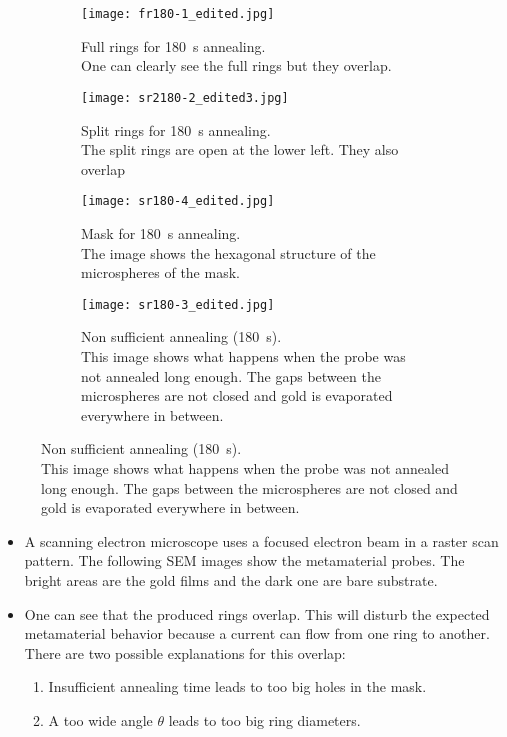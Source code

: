 \captionsetup{
    singlelinecheck=false,
    justification=justified
    }
\begin{figure}[htbp]
\begin{subfigure}[t][][t]{0.48\textwidth}
    \texttt{[image: fr180-1\_edited.jpg]}
    \caption[justification=raggedright]{
        Full rings for \SI{180}{\second} annealing.\\
        One can clearly see the full rings but they overlap.
        }
    \label{fig:sem-fr1}
\end{subfigure}
\hfill
\begin{subfigure}[t][][t]{0.48\textwidth}
    \texttt{[image: sr2180-2\_edited3.jpg]}
    \caption{
        Split rings for \SI{180}{\second} annealing.\\
        The split rings are open at the lower left.
        They also overlap
    }
    \label{fig:sem-sr1}
\end{subfigure}

\begin{subfigure}[t][][t]{0.48\textwidth}
    \texttt{[image: sr180-4\_edited.jpg]}
    \caption{
        Mask for \SI{180}{\second} annealing.\\
        The image shows the hexagonal structure of the microspheres of the mask.
    }
    \label{fig:sem-mask}
\end{subfigure}
\hfill
\begin{subfigure}[t][][t]{0.48\textwidth}
    \texttt{[image: sr180-3\_edited.jpg]}
    \caption{
        Non sufficient annealing (\SI{180}{\second}).\\
        This image shows what happens when the probe was not annealed long enough.
        The gaps between the microspheres are not closed and gold is evaporated everywhere in between.
    }
    \label{fig:sem-nsa}
\end{subfigure}
\end{figure}
\begin{itemize}
    \item A scanning electron microscope uses a focused electron beam in a raster scan pattern.
    The following SEM images show the metamaterial probes.
    The bright areas are the gold films and the dark one are bare substrate.
    \item One can see that the produced rings overlap.
    This will disturb the expected metamaterial behavior because a current can flow from one ring to another.
    There are two possible explanations for this overlap:
    \begin{enumerate}
        \item Insufficient annealing time leads to too big holes in the mask.
        \item A too wide angle $\theta$ leads to too big ring diameters.
    \end{enumerate}
\end{itemize}



